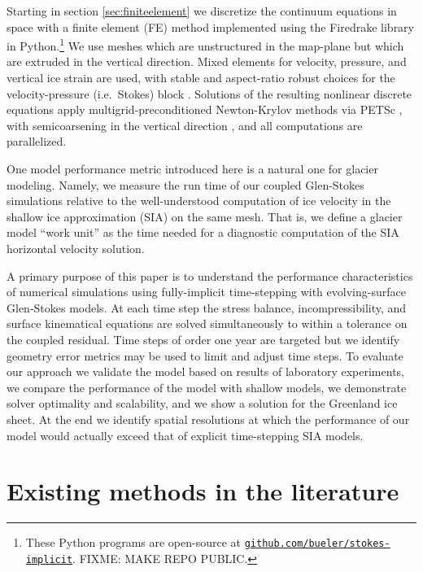 \documentclass[letterpaper,final,12pt,reqno]{amsart}
\begin{document}
Starting in section \ref{sec:finiteelement} we discretize the continuum equations in space with a finite element (FE) method \cite{Elmanetal2014} implemented using the Firedrake library \cite{Rathgeberetal2016} in Python.\footnote{These Python programs are open-source at \href{https://github.com/bueler/stokes-implicit}{\texttt{github.com/bueler/stokes-implicit}}.  FIXME: MAKE REPO PUBLIC.}  We use meshes which are unstructured in the map-plane but which are extruded \cite{Bercea2016,Gibsonetal2019,McRaeetal2016} in the vertical direction.  Mixed elements for velocity, pressure, and vertical ice strain are used, with stable and aspect-ratio robust choices for the velocity-pressure (i.e.~Stokes) block \cite{Elmanetal2014}.  Solutions of the resulting nonlinear discrete equations apply multigrid-preconditioned Newton-Krylov methods \cite{Bueler2021} via PETSc \cite{Balayetal2020}, with semicoarsening in the vertical direction \cite{Tuminaroetal2016}, and all computations are parallelized.

One model performance metric introduced here is a natural one for glacier modeling.  Namely, we measure the run time of our coupled Glen-Stokes simulations relative to the well-understood computation of ice velocity in the shallow ice approximation (SIA) \cite{Fowler1997} on the same mesh.  That is, we define a glacier model ``work unit'' as the time needed for a diagnostic computation of the SIA horizontal velocity solution.

A primary purpose of this paper is to understand the performance characteristics of numerical simulations using fully-implicit time-stepping with evolving-surface Glen-Stokes models.  At each time step the stress balance, incompressibility, and surface kinematical equations are solved simultaneously to within a tolerance on the coupled residual.  Time steps of order one year are targeted but we identify geometry error metrics may be used to limit and adjust time steps.  To evaluate our approach we validate the model based on results of laboratory experiments, we compare the performance of the model with shallow models, we demonstrate solver optimality and scalability, and we show a solution for the Greenland ice sheet.  At the end we identify spatial resolutions at which the performance of our model would actually exceed that of explicit time-stepping SIA models.


\section{Existing methods in the literature}  \label{sec:literature}
\end{document}
